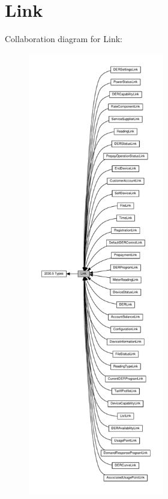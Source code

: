 \hypertarget{group__Link}{}\section{Link}
\label{group__Link}
Collaboration diagram for Link\+:\nopagebreak
\begin{figure}[H]
\begin{center}
\leavevmode
\includegraphics[height=550pt]{group__Link}
\end{center}
\end{figure}
